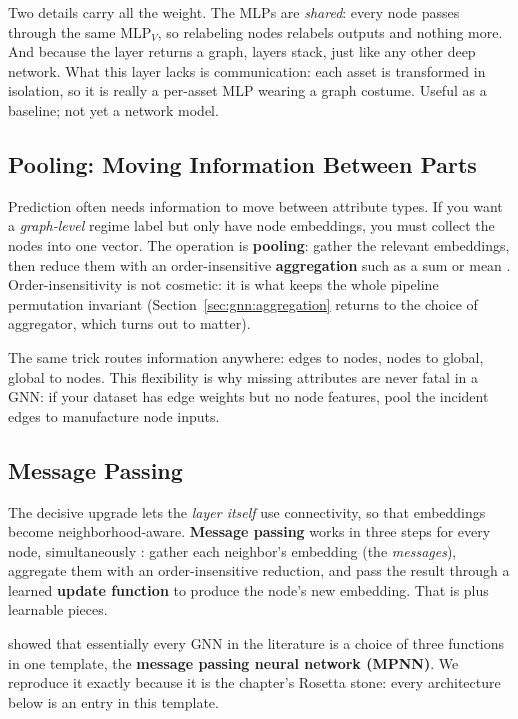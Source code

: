 Two details carry all the weight. The MLPs are \emph{shared}: every node passes through the same $\text{MLP}_V$, so relabeling nodes relabels outputs and nothing more. And because the layer returns a graph, layers stack, just like any other deep network. What this layer lacks is communication: each asset is transformed in isolation, so it is really a per-asset MLP wearing a graph costume. Useful as a baseline; not yet a network model.

\subsection{Pooling: Moving Information Between Parts}\label{sec:gnn:pooling}

Prediction often needs information to move between attribute types. If you want a \emph{graph-level} regime label but only have node embeddings, you must collect the nodes into one vector. The operation is \textbf{pooling}: gather the relevant embeddings, then reduce them with an order-insensitive \textbf{aggregation} such as a sum or mean \citep{SanchezLengeling2021}. Order-insensitivity is not cosmetic: it is what keeps the whole pipeline permutation invariant (Section~\ref{sec:gnn:aggregation} returns to the choice of aggregator, which turns out to matter).

The same trick routes information anywhere: edges to nodes, nodes to global, global to nodes. This flexibility is why missing attributes are never fatal in a GNN: if your dataset has edge weights but no node features, pool the incident edges to manufacture node inputs.

\subsection{Message Passing}\label{sec:gnn:message-passing}

The decisive upgrade lets the \emph{layer itself} use connectivity, so that embeddings become neighborhood-aware. \textbf{Message passing} works in three steps for every node, simultaneously \citep{SanchezLengeling2021}: gather each neighbor's embedding (the \emph{messages}), aggregate them with an order-insensitive reduction, and pass the result through a learned \textbf{update function} to produce the node's new embedding. That is  plus learnable pieces.

\citet{Gilmer2017} showed that essentially every GNN in the literature is a choice of three functions in one template, the \textbf{message passing neural network (MPNN)}. We reproduce it exactly because it is the chapter's Rosetta stone: every architecture below is an entry in this template.

